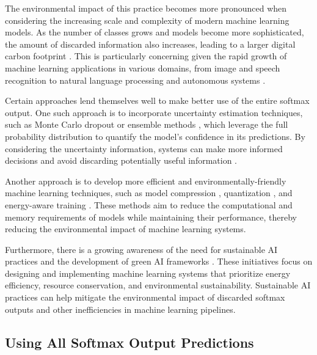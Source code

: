 The environmental impact of this practice becomes more pronounced when considering the increasing scale and complexity of modern machine learning models. As the number of classes grows and models become more sophisticated, the amount of discarded information also increases, leading to a larger digital carbon footprint \cite{lacoste2019quantifying}. This is particularly concerning given the rapid growth of machine learning applications in various domains, from image and speech recognition to natural language processing and autonomous systems \cite{thompson2020computational}.

Certain approaches lend themselves well to make better use of the entire softmax output. One such approach is to incorporate uncertainty estimation techniques, such as Monte Carlo dropout \cite{gal2016dropout} or ensemble methods \cite{lakshminarayanan2017simple}, which leverage the full probability distribution to quantify the model's confidence in its predictions. By considering the uncertainty information, systems can make more informed decisions and avoid discarding potentially useful information \cite{kendall2017uncertainties}.

Another approach is to develop more efficient and environmentally-friendly machine learning techniques, such as model compression \cite{han2015deep}, quantization \cite{gholami2021survey}, and energy-aware training \cite{garcia2021estimation}. These methods aim to reduce the computational and memory requirements of models while maintaining their performance, thereby reducing the environmental impact of machine learning systems.

Furthermore, there is a growing awareness of the need for sustainable AI practices and the development of green AI frameworks \cite{schwartz2020green}. These initiatives focus on designing and implementing machine learning systems that prioritize energy efficiency, resource conservation, and environmental sustainability. Sustainable AI practices can help mitigate the environmental impact of discarded softmax outputs and other inefficiencies in machine learning pipelines.


\subsection{Using All Softmax Output Predictions}

